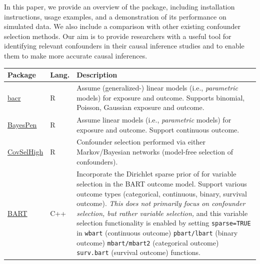 In this paper, we provide an overview of the package, including installation instructions, usage examples, and a demonstration of its performance on simulated data. We also include a comparison with other existing confounder selection methods. Our aim is to provide researchers with a useful tool for identifying relevant confounders in their causal inference studies and to enable them to make more accurate causal inferences.


\begin{table}[t!]
\centering
\begin{tabular}{p{4.9cm}lp{7.9cm}}
\hline
Package           & Lang.   & Description \\ \hline
\href{https://CRAN.R-project.org/package=bacr}{bacr} \citep{wang2015accounting}                  & R       & Assume (generalized-) linear models (i.e., \emph{parametric} models) for exposure and outcome. Supports binomial, Poisson, Gaussian exposure and outcome.  \\
\hline
\href{https://cran.r-project.org/package=BayesPen}{BayesPen}  \citep{bayespen}                            & R  & Assume linear models (i.e., \emph{parametric} models) for exposure and outcome. Support continuous outcome. \\
\hline
\href{https://cran.r-project.org/package=CovSelHigh}{CovSelHigh} \citep{covselhigh}                         & R       & Confounder selection performed via either Markov/Bayesian networks (model-free selection of confounders). \\ 
                                           \hline
 \href{https://cran.r-project.org/package=BART}{BART}   \citep{BART}                      & C++       & Incorporate the Dirichlet sparse prior of \cite{linero2018bayesian} for variable selection in the BART outcome model. Support various outcome types (categorical, continuous, binary, survival outcome). \emph{This does not primarily focus on confounder selection, but rather variable selection,} and this variable selection functionality is enabled by setting \verb|sparse=TRUE| in \verb|wbart| (continuous outcome) \verb|pbart/lbart| (binary outcome) \verb|mbart/mbart2| (categorical outcome) \verb|surv.bart| (survival outcome) functions.
                                           \\ \hline


\end{tabular}
\end{table}
